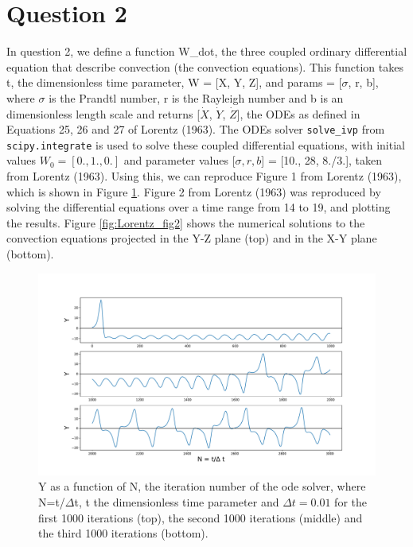 \documentclass{article}
\begin{document}
\section*{Question 2}
In question 2, we define a function W\_dot, the three coupled ordinary differential equation that describe convection (the convection equations). This function takes t, the dimensionless time parameter, W = [X, Y, Z], and params = [$\sigma$, r, b], where $\sigma$ is the Prandtl number, r is the Rayleigh number and b is an dimensionless length scale and returns [$\dot{X}$, $\dot{Y}$, $\dot{Z}$], the ODEs as defined in Equations 25, 26 and 27 of Lorentz (1963). The ODEs solver \texttt{solve\_ivp} from \texttt{scipy.integrate} is used to solve these coupled differential equations, with initial values  $W_0=[0., 1., 0.]$ and parameter values [$\sigma, r, b$] = [10., 28, 8./3.], taken from Lorentz (1963).
Using this, we can reproduce Figure 1 from Lorentz (1963), which is shown in Figure \ref{fig:Lorentz_fig1}. Figure 2 from Lorentz (1963) was reproduced by solving the differential equations over a time range from 14 to 19, and plotting the results. Figure \ref{fig:Lorentz_fig2} shows the numerical solutions to the convection equations projected in the Y-Z plane (top) and in the X-Y plane (bottom).

\begin{figure}[h]
    \centering
    \includegraphics[scale=0.4]{Lorentz_fig1.pdf}
    \caption{Y as a function of N, the iteration number of the ode solver, where N=t/$\Delta$t, t the dimensionless time parameter and $\Delta t =0.01$ for the first 1000 iterations (top), the second 1000 iterations (middle) and the third 1000 iterations (bottom).}
    \label{fig:Lorentz_fig1}
\end{figure}
\end{document}
